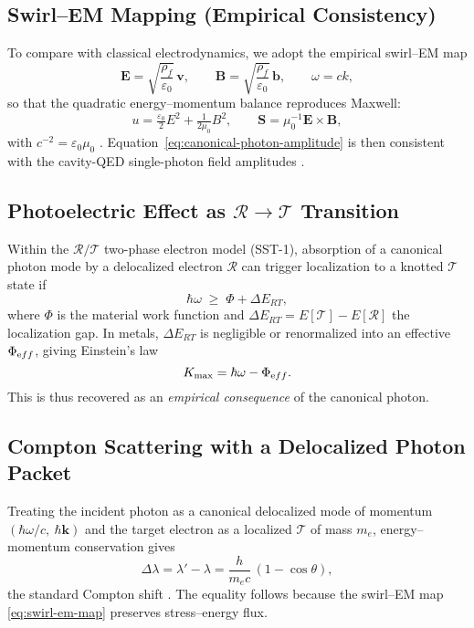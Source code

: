 \documentclass[11pt,a4paper]{article}
\newcommand{\rhof}{\rho_{\!f}}                           %
\begin{document}
    \subsection{Swirl--EM Mapping (Empirical Consistency)}
    To compare with classical electrodynamics, we adopt the
    empirical swirl--EM map
    \begin{equation}
    \mathbf{E}=\sqrt{\frac{\rhof}{\varepsilon_0}}\,\mathbf{v},\qquad
    \mathbf{B}=\sqrt{\frac{\rhof}{\varepsilon_0}}\,\mathbf{b},\qquad
    \omega=ck,
    \label{eq:swirl-em-map}
    \end{equation}
    so that the quadratic energy--momentum balance reproduces Maxwell:
    \[
    u=\tfrac{\varepsilon_0}{2}E^2+\tfrac{1}{2\mu_0}B^2,\qquad
    \mathbf{S}=\mu_0^{-1}\mathbf{E}\!\times\!\mathbf{B},
    \]
    with $c^{-2}=\varepsilon_0\mu_0$ \cite{Jackson1999}.
    Equation~\eqref{eq:canonical-photon-amplitude} is then consistent with the
    cavity-QED single-photon field amplitudes \cite{HarocheRaimond2006,ScullyZubairy1997}.

    \subsection{Photoelectric Effect as $\mathcal R\!\to\!\mathcal T$ Transition}
    Within the $\mathcal R/\mathcal T$ two-phase electron model (SST-1),
    absorption of a canonical photon mode by a delocalized electron $\mathcal R$
    can trigger localization to a knotted $\mathcal T$ state if
    \begin{equation}
    \hbar\omega \;\ge\; \Phi + \Delta E_{RT},
    \end{equation}
    where $\Phi$ is the material work function and
    $\Delta E_{RT}=E[\mathcal T]-E[\mathcal R]$ the localization gap.
    In metals, $\Delta E_{RT}$ is negligible or renormalized into
    an effective $\Phi_{\textrm eff}$, giving Einstein’s law
    \begin{equation}
    K_{\max}=\hbar\omega-\Phi_{\textrm eff}.
    \end{equation}
    This is thus recovered as an \emph{empirical consequence} of the canonical photon.

    \subsection{Compton Scattering with a Delocalized Photon Packet}
    Treating the incident photon as a canonical delocalized mode of momentum
    $(\hbar\omega/c,\ \hbar\mathbf{k})$ and the target electron as a localized $\mathcal T$
    of mass $m_e$, energy--momentum conservation gives
    \begin{equation}
    \Delta\lambda=\lambda'-\lambda=\frac{h}{m_e c}\,(1-\cos\theta),
    \end{equation}
    the standard Compton shift \cite{Compton1923}.
    The equality follows because the swirl--EM map
    \eqref{eq:swirl-em-map} preserves stress--energy flux.
\end{document}
